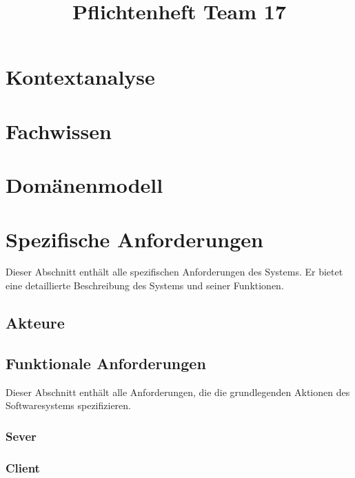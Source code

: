 \documentclass{uulm-assignment}
\title{Pflichtenheft Team 17}
\begin{document}
\maketitle

\listoftodos

\clearpage
\section{Kontextanalyse}


\clearpage
\section{Fachwissen}


\clearpage
\section{Domänenmodell}


\clearpage
\section{Spezifische Anforderungen}
Dieser Abschnitt enthält alle spezifischen Anforderungen des Systems. Er bietet eine detaillierte
Beschreibung des Systems und seiner Funktionen.


\subsection{Akteure}


\clearpage
\subsection{Funktionale Anforderungen}

Dieser Abschnitt enthält alle Anforderungen, die die grundlegenden Aktionen des Softwaresystems
spezifizieren.

\subsubsection{Sever}



\clearpage
\subsubsection{Client}

\end{document}
